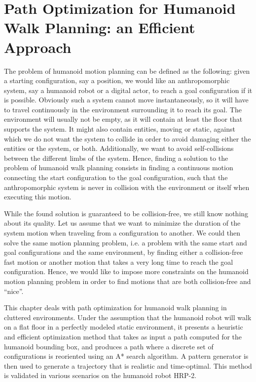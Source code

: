 \chapter{Path Optimization for Humanoid Walk Planning: an Efficient Approach}
\label{chap:path-optim}

The problem of humanoid motion planning can be defined as the
following: given a starting configuration, say a position, we would
like an anthropomorphic system, say a humanoid robot or a digital
actor, to reach a goal configuration if it is possible. Obviously such
a system cannot move instantaneously, so it will have to travel
continuously in the environment surrounding it to reach its goal. The
environment will usually not be empty, as it will contain at least the
floor that supports the system. It might also contain entities, moving
or static, against which we do not want the system to collide in order
to avoid damaging either the entities or the system, or
both. Additionally, we want to avoid self-collisions between the
different limbs of the system. Hence, finding a solution to the
problem of humanoid walk planning consists in finding a continuous
motion connecting the start configuration to the goal configuration,
such that the anthropomorphic system is never in collision with the
environment or itself when executing this motion.

While the found solution is guaranteed to be collision-free, we still
know nothing about its quality. Let us assume that we want to minimize
the duration of the system motion when traveling from a configuration
to another. We could then solve the same motion planning problem,
i.e. a problem with the same start and goal configurations and the
same environment, by finding either a collision-free fast motion or
another motion that takes a very long time to reach the goal
configuration. Hence, we would like to impose more constraints on the
humanoid motion planning problem in order to find motions that are
both collision-free and ``nice''.

This chapter deals with path optimization for humanoid walk planning
in cluttered environments. Under the assumption that the humanoid
robot will walk on a flat floor in a perfectly modeled static
environment, it presents a heuristic and efficient optimization method
that takes as input a path computed for the humanoid bounding box, and
produces a path where a discrete set of configurations is reoriented
using an A* search algorithm. A pattern generator is then used to
generate a trajectory that is realistic and time-optimal. This method
is validated in various scenarios on the humanoid robot HRP-2.


